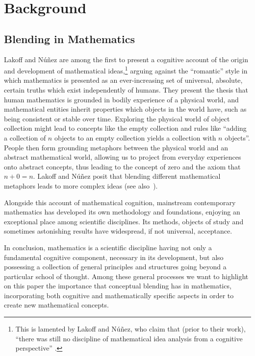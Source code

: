 \section{Background}
\label{sec:background}

\subsection{Blending in Mathematics}
\label{subsec:mathblend}

Lakoff and N{\'u}{\~n}ez \citep{Lak00} are among the first to present
a cognitive account of the origin and development of mathematical
ideas,\footnote{This is lamented by Lakoff and N{\'u}{\~n}ez, who
claim that (prior to their work), ``there was still no discipline of
mathematical idea analysis from a cognitive perspective''
\citep{Lak00}.} arguing against the ``romantic'' style in which
mathematics is presented as an ever-increasing set of universal,
absolute, certain truths which exist independently of humans. They
present the thesis that human mathematics is grounded in bodily
experience of a physical world, and mathematical entities inherit
properties which objects in the world have, such as being consistent
or stable over time.  Exploring the physical world of object
collection might lead to concepts like the empty collection and rules
like ``adding a collection of $n$ objects to an empty collection
yields a collection with $n$ objects''. People then form grounding
metaphors between the physical world and an abstract mathematical
world, allowing us to project from everyday experiences onto abstract
concepts, thus leading to the concept of zero and the axiom that $n +
0 = n$. Lakoff and N{\'u}{\~n}ez posit that blending different
mathematical metaphors leads to more complex ideas (see
also~\textcite{Al11i}). 

Alongside this account of mathematical cognition, mainstream
contemporary mathematics has developed its own methodology and
foundations, enjoying an exceptional place among scientific
disciplines. Its methods, objects of study and sometimes astonishing
results have widespread, if not universal, acceptance.

In conclusion, mathematics is a scientific discipline having not only
a fundamental cognitive component, necessary in its development, but
also possessing a collection of general principles and structures
going beyond a particular school of thought.  Among these general
processes we want to highlight on this paper the importance that
conceptual blending has in mathematics, incorporating both cognitive and
mathematically specific aspects in order to create new mathematical concepts.


